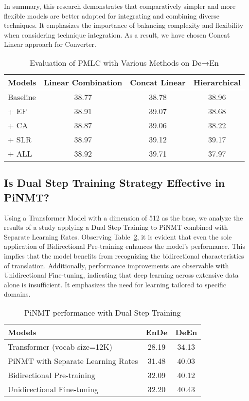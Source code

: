 \documentclass[conference]{IEEEtran}
\begin{document}
In summary, this research demonstrates that comparatively simpler and more flexible models are better adapted for integrating and combining diverse techniques. It emphasizes the importance of balancing complexity and flexibility when considering technique integration. As a result, we have chosen Concat Linear approach for Converter.

\begin{table}[!tb]
\renewcommand{\arraystretch}{1.3}
\caption{Evaluation of PMLC with Various Methods on De→En}
\label{tab:6}
\centering
\begin{tabular}{|l|c|c|c|}
\hline
\textbf{Models} & \textbf{Linear Combination} & \textbf{Concat Linear} & \textbf{Hierarchical} \\
\hline
Baseline & 38.77 & 38.78 & 38.96 \\
+ EF & 38.91 & 39.07 & 38.68 \\
+ CA & 38.87 & 39.06 & 38.22 \\
+ SLR & 38.97 & 39.12 & 39.17 \\
\hline
+ ALL & 38.92 & 39.71 & 37.97 \\
\hline
\end{tabular}
\end{table}


\subsection{Is Dual Step Training Strategy Effective in PiNMT?}
Using a Transformer Model with a dimension of 512 as the base, we analyze the results of a study applying a Dual Step Training to PiNMT combined with Separate Learning Rates. Observing Table~\ref{tab:7}, it is evident that even the sole application of Bidirectional Pre-training enhances the model's performance. This implies that the model benefits from recognizing the bidirectional characteristics of translation. Additionally, performance improvements are observable with Unidirectional Fine-tuning, indicating that deep learning across extensive data alone is insufficient. It emphasizes the need for learning tailored to specific domains.

\begin{table}[!tb]
    \centering
    \caption{PiNMT performance with Dual Step Training}
    \label{tab:7}
    \begin{tabular}{|l|c|c|}
        \hline
        \textbf{Models} & \textbf{EnDe} & \textbf{DeEn} \\
        \hline
        Transformer (vocab size=12K) & 28.19 & 34.13 \\
        \hline
        PiNMT with Separate Learning Rates & 31.48 & 40.03 \\
        Bidirectional Pre-training & 32.09 & 40.12 \\
        Unidirectional Fine-tuning & 32.20 & 40.43 \\
        \hline
    \end{tabular}
\end{table}
\end{document}
